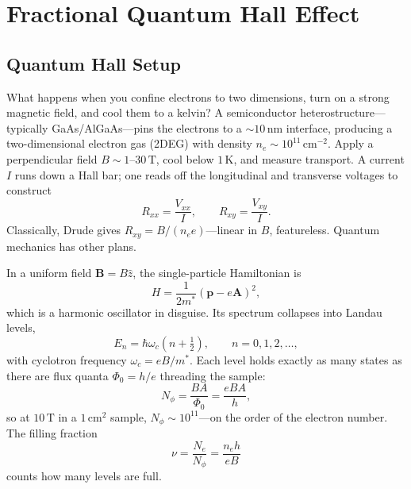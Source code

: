 \section{Fractional Quantum Hall Effect}
\label{sec:fqhe}

\subsection{Quantum Hall Setup}
\label{subsec:hall-setup}

What happens when you confine electrons to two dimensions, turn on a strong magnetic field, and cool them to a kelvin? A semiconductor heterostructure---typically GaAs/AlGaAs---pins the electrons to a $\sim 10\,\text{nm}$ interface, producing a two-dimensional electron gas (2DEG) with density $n_e \sim 10^{11}\,\text{cm}^{-2}$. Apply a perpendicular field $B \sim 1\text{--}30\,\text{T}$, cool below $1\,\text{K}$, and measure transport. A current $I$ runs down a Hall bar; one reads off the longitudinal and transverse voltages to construct
\begin{equation}
  R_{xx} = \frac{V_{xx}}{I}, \qquad R_{xy} = \frac{V_{xy}}{I}.
  \label{eq:hall-resistances}
\end{equation}
Classically, Drude gives $R_{xy} = B/(n_e e)$---linear in $B$, featureless. Quantum mechanics has other plans.

In a uniform field $\mathbf{B} = B\hat{z}$, the single-particle Hamiltonian is
\begin{equation}
  H = \frac{1}{2m^*}(\mathbf{p} - e\mathbf{A})^2,
  \label{eq:landau-hamiltonian}
\end{equation}
which is a harmonic oscillator in disguise. Its spectrum collapses into Landau levels,
\begin{equation}
  E_n = \hbar\omega_c\!\left(n + \tfrac{1}{2}\right), \qquad n = 0,1,2,\ldots,
  \label{eq:landau-levels}
\end{equation}
with cyclotron frequency $\omega_c = eB/m^*$. Each level holds exactly as many states as there are flux quanta $\Phi_0 = h/e$ threading the sample:
\begin{equation}
  N_\phi = \frac{BA}{\Phi_0} = \frac{eBA}{h},
  \label{eq:flux-quanta}
\end{equation}
so at $10\,\text{T}$ in a $1\,\text{cm}^2$ sample, $N_\phi \sim 10^{11}$---on the order of the electron number. The filling fraction
\begin{equation}
  \nu = \frac{N_e}{N_\phi} = \frac{n_e h}{eB}
  \label{eq:filling-fraction}
\end{equation}
counts how many levels are full.

